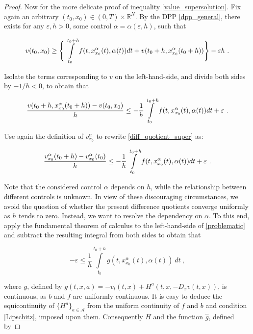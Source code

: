 \begin{theorem}
\begin{proof}
		Now for the more delicate proof of inequality \eqref{value_supersolution}. Fix again an arbitrary $ (t_0, x_0) \in \left( 0 , T \right) \times \mathbb{R}^N $. By the DPP \eqref{dpp_general}, there exists for any $ \varepsilon, h > 0 $, some control $ \alpha = \alpha(\varepsilon, h) $, such that
		
		\begin{equation*}
			v(t_0, x_0) \geq \Bigg\{ \pathint{\alpha}{t_0}{t_0 + h} + v(t_0 + h, x^{\alpha}_{x_0}(t_0 + h)) \Bigg\} - \varepsilon h \ .
		\end{equation*}
		
		Isolate the terms corresponding to $ v $ on the left-hand-side, and divide both sides by $ -1 / h < 0 $, to obtain that
		
		\begin{equation}
			\label{diff_quotient_super}
			\frac{v(t_0 + h, x^{\alpha}_{x_0}(t_0 + h)) - v(t_0, x_0)}{h} \leq - \frac{1}{h} \pathint{\alpha}{t_0}{t_0 + h} + \varepsilon \ .
		\end{equation}
		
		Use again the definition of $ v^{\alpha}_{x_0} $ to rewrite \eqref{diff_quotient_super} as:
		
		\begin{equation}
		\label{problematic}
			\frac{v^{\alpha}_{x_0}(t_0 + h) - v^{\alpha}_{x_0}(t_0)}{h} \leq - \frac{1}{h} \pathint{\alpha}{t_0}{t_0 + h} + \varepsilon \ .
		\end{equation}
		
		Note that the considered control $ \alpha $ depends on $ h $, while the relationship between different controls is unknown. In view of these discouraging circumstances, we avoid the question of whether the present difference quotients converge uniformly as $ h $ tends to zero. Instead, we want to resolve the dependency on $ \alpha $. To this end, apply the fundamental theorem of calculus to the left-hand-side of \eqref{problematic} and subtract the resulting integral from both sides to obtain that
		
		\begin{equation}
			\label{resolve}
			- \varepsilon \leq \frac{1}{h} \int\limits^{t_0 + h}_{t_0} g(t, x^{\alpha}_{x_0}(t), \alpha(t)) \ dt \ ,
		\end{equation}
		
		where $ g $, defined by $ g(t, x, a) = - v_t(t, x) + H^{a}(t, x, -D_x v(t, x)) $, is continuous, as $ b $ and $ f $ are uniformly continuous. It is easy to deduce the equicontinuity of $ \{ H^{a} \}_{a \in \mathcal{A}}  $ from the uniform continuity of $ f $ and $ b $ and condition \eqref{Lipschitz}, imposed upon them. Consequently $ H $ and the function $ \hat{g} $, defined by
		

\end{proof}
\end{theorem}
